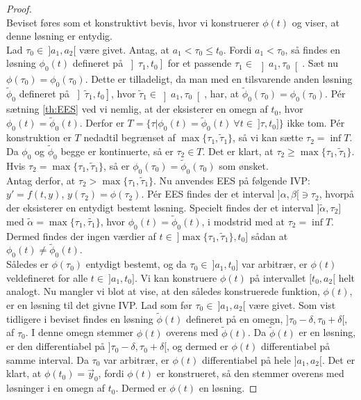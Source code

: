 \begin{proof}\\
Beviset føres som et konstruktivt bevis, hvor vi konstruerer $\phi(t)$ og viser, at denne løsning er entydig.\\ \hfill \break
   Lad $\tau_0\in \ ]a_1,a_2[$ være givet. Antag, at $a_1<\tau_0\leq t_0$. Fordi $a_1<\tau_0$, så findes en løsning $\phi_0(t)$ defineret på $\left]\tau_1,t_0\right]$ for et passende $\tau_1\in \ \left]a_1,\tau_0\right[$. Sæt nu $\phi(\tau_0) = \phi_0(\tau_0)$. Dette er tilladeligt, da man med en tilsvarende anden løsning $\tilde{\phi}_0$ defineret på $ \left]\tilde{\tau}_1, t_0\right]$, hvor $\tilde{\tau}_1\in \left]a_1,\tau_0\right[$,  har, at $\tilde{\phi}_0(\tau_0)=\phi_0(\tau_0)$. Pér sætning \ref{th:EES} ved vi nemlig, at der eksisterer en omegn af $t_0$, hvor $\phi_0(t) = \tilde{\phi}_0(t)$. Derfor er $T = \{\tau | \phi_0(t) = \tilde{\phi}_0(t) \ \forall t \in \ ]\tau, t_0] \}$ ikke tom. Pér konstruktion er $T$ nedadtil begrænset af $\max\{\tau_1,\tilde{\tau}_1\}$, så vi kan sætte $\tau_2 = \inf T$. Da $\phi_0$ og $ \tilde{\phi}_0$ begge er kontinuerte, så er $\tau_2 \in T$. Det er klart, at $\tau_2 \geq \max\{\tau_1,\tilde{\tau}_1\}$. Hvis $\tau_2 = \max\{\tau_1,\tilde{\tau}_1\}$, så er $\phi_0(\tau_0) = \tilde{\phi}_0(\tau_0)$ som ønsket. \\ \hfill \break
   Antag derfor, at $\tau_2>\max\{\tau_1,\tilde{\tau}_1\}$. Nu anvendes EES på følgende IVP: $y' = f(t,y)$, $y(\tau_2) = \phi(\tau_2)$. Pér EES findes der et interval $]\alpha, \beta[\ni\tau_2$, hvorpå der eksisterer en entydigt bestemt løsning. Specielt findes der et interval $]\tilde{\alpha},\tau_2]$ med $\tilde{\alpha}=\max\{\tau_1,\tilde{\tau_1}\}$, hvor $\phi_0(t) = \tilde{\phi}_0(t)$, i modstrid med at $\tau_2=\inf T$. Dermed findes der ingen værdier af $t\in \ ]\max\{\tau_1,\tilde{\tau}_1\},t_0]$ sådan at $\phi_0(t) \neq \tilde{\phi}_0(t)$.\\ \hfill \break Således er $\phi(\tau_0)$ entydigt bestemt, og da $\tau_0\in \ ]a_1,t_0]$ var arbitrær, er $\phi(t)$ veldefineret for alle $t\in  \ ]a_1,t_0]$. Vi kan konstruere $\phi(t)$ på intervallet $[t_0,a_2[$ helt analogt. Nu mangler vi blot at vise, at den således konstruerede funktion, $\phi(t)$, er en løsning til det givne IVP. Lad som før $\tau_0\in  \ ]a_1,a_2[$ være givet. Som vist tidligere i beviset findes en løsning $\tilde{\phi}(t)$ defineret på en omegn, $]\tau_0-\delta,\tau_0+\delta[$, af $\tau_0$. I denne omegn stemmer $\phi(t)$ overens med $\tilde{\phi}(t)$. Da $\tilde{\phi}(t)$ er en løsning, er den differentiabel på $]\tau_0-\delta,\tau_0+\delta[$, og dermed er $\phi(t)$ differentiabel på samme interval. Da $\tau_0$ var arbitrær, er $\phi(t)$ differentiabel på hele $]a_1,a_2[$. Det er klart, at $\phi(t_0)=\vec{y}_0$, fordi $\phi(t)$ er konstrueret, så den stemmer overens med løsninger i en omegn af $t_0$. Dermed er $\phi(t)$ en løsning. 
\end{proof}\\ \hfill \break
